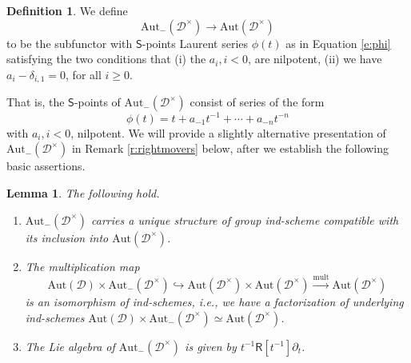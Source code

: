 \documentclass{amsart}
\newtheorem{Lem}[Thm]{Lemma}
\theoremstyle{definition}
\newtheorem{defi}[Thm]{Definition}
\newcommand{\sD}{\mathscr{D}}
\newcommand{\Sing}{\mathsf{S}}
\newcommand{\on}{\mathrm}
\newcommand{\Ring}{\mathsf{R}}
\newcommand{\Am}{\Aut_-(\pD)}
\newcommand{\pD}{\sD^\times}
\newcommand{\Aut}{\on{Aut}}
\numberwithin{equation}{section}
\begin{document}
\begin{defi} We define $$\Am \rightarrow \Aut(\pD)$$
to be the subfunctor with $\Sing$-points Laurent series $\phi(t)$ as in Equation \eqref{e:phi} satisfying the two conditions that (i) the $a_i, i < 0$, are nilpotent, (ii) we have  $a_i - \delta_{i, 1} = 0$, for all $i \geqslant 0$. 
\end{defi}
That is, the $\Sing$-points of $\Am$ consist of series of the form 
\begin{equation} \label{e:autminus} \phi(t) = t + a_{-1} t^{-1} + \cdots + a_{-n} t^{-n}\end{equation}
with $a_i, i < 0$, nilpotent. We will provide a slightly alternative presentation of $\Am$ in Remark \ref{r:rightmovers} below, after we establish the following basic assertions. 

\begin{Lem}\label{l:autpd-} The following hold. 

\begin{enumerate} \item $\Am$ carries a unique structure of group ind-scheme compatible with its inclusion into $\Aut(\pD)$. 

\item The multiplication map  
$$\Aut(\sD) \times \Am \hookrightarrow \Aut(\pD) \times \Aut(\pD)  \xrightarrow{\on{mult}} \Aut(\pD)$$
is an isomorphism of ind-schemes, i.e., we have a factorization of underlying ind-schemes $\Aut(\sD) \times \Am \simeq \Aut(\pD)$.  

\item The Lie algebra of $\Am$ is given by $t^{-1} \Ring[t^{-1}]\partial_t$. 

\end{enumerate}
\end{Lem}
\end{document}
